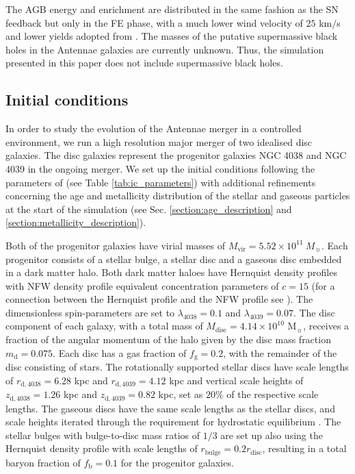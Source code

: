 \documentclass[a4paper,fleqn,usenatbib]{mnras}
\begin{document}
The AGB energy and enrichment are distributed in the same fashion 
as the SN feedback but only in the FE phase, with a much lower wind velocity 
of $25$ km$/$s and lower yields adopted from \citet{2010MNRAS.403.1413K}. The masses 
of the putative supermassive black holes in the Antennae galaxies are currently unknown. Thus, the
simulation presented in this paper does not include supermassive black holes. 



\subsection{Initial conditions}

In order to study the evolution of the Antennae merger in a controlled environment,
we run a high resolution major merger of two idealised disc galaxies. The 
disc galaxies represent the progenitor galaxies NGC 4038 and NGC 4039 in the ongoing merger.
We set up the initial conditions following the parameters of \citet{2010ApJ...715L..88K} (see Table \ref{tab:ic_parameters})
with additional refinements concerning the age and metallicity distribution of the stellar and gaseous particles at the start
of the simulation (see Sec. \ref{section:age_description} and \ref{section:metallicity_description}).

Both of the progenitor galaxies have virial masses of 
$M_\mathrm{vir}=5.52\times 10^{11} \ M_{\sun}$. Each progenitor consists of a 
stellar bulge, a stellar disc and a gaseous disc embedded in a dark matter halo.  Both dark matter haloes have Hernquist 
density profiles \citep{1990ApJ...356..359H} with NFW density profile equivalent 
concentration parameters of $c=15$ (for a connection between the Hernquist profile and the NFW
profile see \citealt{2005MNRAS.361..776S}). The
dimensionless spin-parameters \citep[see e.g.][]{2001ApJ...555..240B} are set to $\lambda_{4038}=0.1$ and 
$\lambda_{4039}=0.07$. The 
disc component of each galaxy, with a total mass of $M_\mathrm{disc}=4.14\times 
10^{10}$ M$_{\sun}$, receives a fraction of the angular momentum of the halo 
given by the disc mass fraction $m_\mathrm{d}=0.075$. Each disc has a gas 
fraction of $f_\mathrm{g}=0.2$, with the remainder of the disc consisting of stars. The 
rotationally supported stellar discs have scale lengths of
$r_\mathrm{d,4038}=6.28$ kpc and $r_\mathrm{d,4039}=4.12$ kpc and vertical scale heights 
of $z_\mathrm{d,4038}=1.26$ kpc and $z_\mathrm{d,4039}=0.82$ kpc, set as 
$20\%$ of the respective scale lengths. The gaseous discs have the same scale lengths 
as the stellar discs, and scale heights iterated through the requirement for 
hydrostatic equilibrium \citep{2005MNRAS.361..776S}. The stellar bulges with bulge-to-disc 
mass ratios of $1/3$ are set up also using the Hernquist density profile with scale 
lengths of $r_\mathrm{bulge}=0.2r_\mathrm{disc}$, resulting in a total baryon 
fraction of $f_\mathrm{b}=0.1$ for the progenitor galaxies. 
\end{document}
